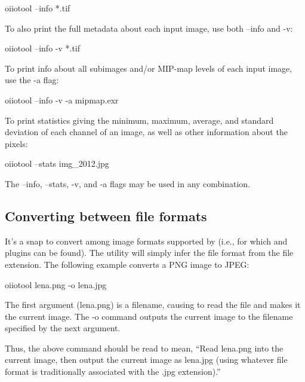 \begin{code}
    oiiotool --info *.tif
\end{code}

\noindent To also print the full metadata about each input image, use both
{\cf --info} and {\cf -v}:

\begin{code}
    oiiotool --info -v *.tif
\end{code}

\noindent To print info about all subimages and/or MIP-map levels of each
input image, use the {\cf -a} flag:

\begin{code}
    oiiotool --info -v -a mipmap.exr
\end{code}

\noindent To print statistics giving the minimum, maximum, average, and
standard deviation of each channel of an image, as well as other
information about the pixels:

\begin{code}
    oiiotool --stats img_2012.jpg
\end{code}

\noindent The {\cf --info}, {\cf --stats}, {\cf -v}, and {\cf -a} flags may
be used in any combination.


\subsection*{Converting between file formats}

It's a snap to convert among image formats supported by \product
(i.e., for which \ImageInput and \ImageOutput plugins can be found).
The \oiiotool utility will simply infer the file format from the
file extension. The following example converts a PNG image to JPEG:

\begin{code}
    oiiotool lena.png -o lena.jpg
\end{code}

The first argument ({\cf lena.png}) is a filename, causing \oiiotool to
read the file and makes it the current image.  The {\cf -o} command
outputs the current image to the filename specified by the next
argument.

Thus, the above command should be read to mean, ``Read {\cf lena.png}
into the current image, then output the current image as {\cf lena.jpg}
(using whatever file format is traditionally associated with the {\cf
  .jpg} extension).''


